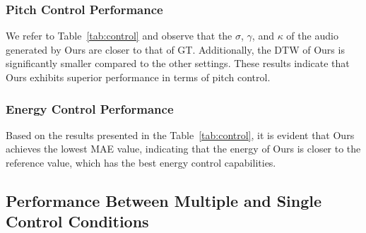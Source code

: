 \documentclass[letterpaper]{article}
\begin{document}
\subsubsection{Pitch Control Performance} We refer to Table~\ref{tab:control} and observe that the $\sigma$, $\gamma$, and $\kappa$ of the audio generated by Ours are closer to that of GT. Additionally, the DTW of Ours is significantly smaller compared to the other settings. These results indicate that Ours exhibits superior performance in terms of pitch control.

\subsubsection{Energy Control Performance} Based on the results presented in the Table~\ref{tab:control}, it is evident that Ours achieves the lowest MAE value, indicating that the energy of Ours is closer to the reference value, which has the best energy control capabilities.

\subsection{Performance Between Multiple and Single Control Conditions}

\begin{table}[!h]\footnotesize
    \centering
    \caption{The control performance between multiple and single control condition.}
    \label{tab:multi}
\end{table}
\end{document}

